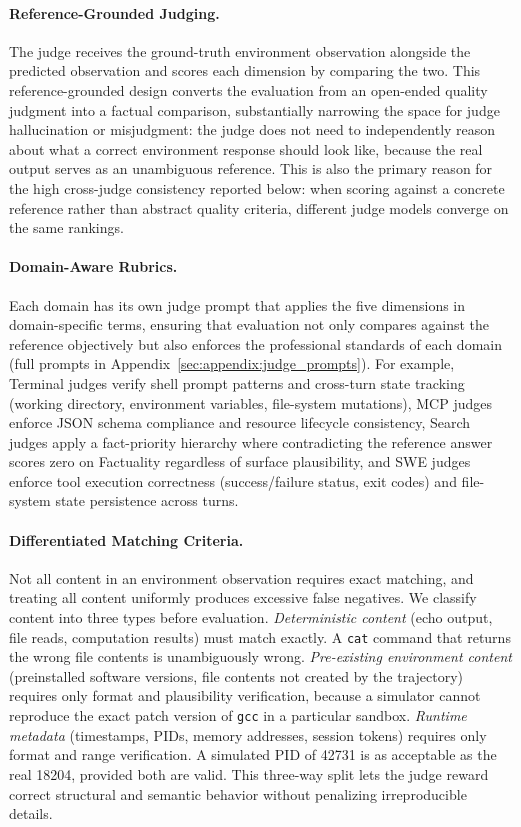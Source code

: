 \paragraph{Reference-Grounded Judging.}
The judge receives the ground-truth environment observation alongside the predicted observation and scores each dimension by comparing the two.
This reference-grounded design converts the evaluation from an open-ended quality judgment into a factual comparison, substantially narrowing the space for judge hallucination or misjudgment: the judge does not need to independently reason about what a correct environment response should look like, because the real output serves as an unambiguous reference.
This is also the primary reason for the high cross-judge consistency reported below: when scoring against a concrete reference rather than abstract quality criteria, different judge models converge on the same rankings.

\paragraph{Domain-Aware Rubrics.}
Each domain has its own judge prompt that applies the five dimensions in domain-specific terms, ensuring that evaluation not only compares against the reference objectively but also enforces the professional standards of each domain (full prompts in Appendix~\ref{sec:appendix:judge_prompts}).
For example, Terminal judges verify shell prompt patterns and cross-turn state tracking (working directory, environment variables, file-system mutations), MCP judges enforce JSON schema compliance and resource lifecycle consistency, Search judges apply a fact-priority hierarchy where contradicting the reference answer scores zero on Factuality regardless of surface plausibility, and SWE judges enforce tool execution correctness (success/failure status, exit codes) and file-system state persistence across turns.

\paragraph{Differentiated Matching Criteria.}
Not all content in an environment observation requires exact matching, and treating all content uniformly produces excessive false negatives.
We classify content into three types before evaluation.
\emph{Deterministic content} (echo output, file reads, computation results) must match exactly. A \texttt{cat} command that returns the wrong file contents is unambiguously wrong.
\emph{Pre-existing environment content} (preinstalled software versions, file contents not created by the trajectory) requires only format and plausibility verification, because a simulator cannot reproduce the exact patch version of \texttt{gcc} in a particular sandbox.
\emph{Runtime metadata} (timestamps, PIDs, memory addresses, session tokens) requires only format and range verification. A simulated PID of 42731 is as acceptable as the real 18204, provided both are valid.
This three-way split lets the judge reward correct structural and semantic behavior without penalizing irreproducible details.

